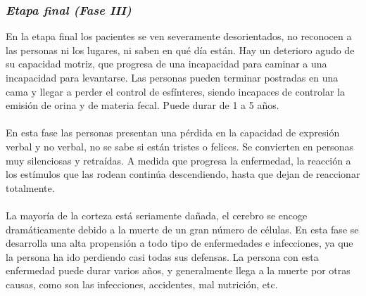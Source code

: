 \documentclass[smallextended, 12pt]{article}
\begin{document}
	\subsubsection{\textit{Etapa final (Fase III)}}
	En la etapa final los pacientes se ven severamente desorientados, no reconocen a las personas ni los lugares, ni saben en qu\'e d\'ia est\'an. Hay un deterioro agudo de su capacidad motriz, que progresa de una incapacidad para caminar a una incapacidad para levantarse. Las personas pueden terminar postradas en una cama y llegar a perder el control de esf\'interes, siendo incapaces de controlar la emisi\'on de orina y de materia fecal. Puede durar de 1 a 5 a\~nos. \cite{ref3} \cite{ref8}\\
	\\
	En esta fase las personas presentan una p\'erdida en la capacidad de expresi\'on verbal y no verbal, no se sabe si est\'an tristes o felices. Se convierten en personas muy silenciosas y retra\'idas. A medida que progresa la enfermedad, la reacci\'on a los est\'imulos que las rodean contin\'ua descendiendo, hasta que dejan de reaccionar totalmente. \cite{ref8}\\
	\\
	La mayor\'ia de la corteza est\'a seriamente da\~nada, el cerebro se encoge dram\'aticamente debido a la muerte de un gran n\'umero de c\'elulas. En esta fase se desarrolla una alta propensi\'on a todo tipo de enfermedades e infecciones, ya que la persona ha ido perdiendo casi todas sus defensas. La persona con esta enfermedad puede durar varios a\~nos, y generalmente llega a la muerte por otras causas, como son las infecciones, accidentes, mal nutrici\'on, etc. \cite{ref3} \cite{ref8}
	
\end{document}
